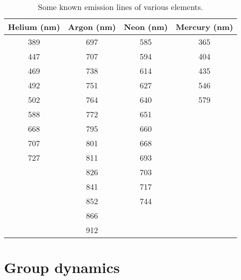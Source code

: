 \begin{table}
	\centering
	\begin{tabular}{c|c|c|c}
		\toprule
		\textbf{Helium (nm)} & \textbf{Argon (nm)} & \textbf{Neon (nm)} & \textbf{Mercury (nm)} \\ \midrule
		389 & 697 & 585 & 365 \\
		447 & 707 & 594 & 404 \\
		469 & 738 & 614 & 435 \\
		492 & 751 & 627 & 546 \\
		502 & 764 & 640 & 579 \\
		588 & 772 & 651 & \\
		668 & 795 & 660 & \\
		707 & 801 & 668 & \\
		727 & 811 & 693 & \\
		& 826 & 703 & \\
		& 841 & 717 & \\
		& 852 & 744 & \\
		& 866 & & \\
		& 912 & & \\ \bottomrule
	\end{tabular}
	\caption{Some known emission lines of various elements.}\label{spec:tab:emissions}
\end{table}

%
%

\section{Group dynamics}

